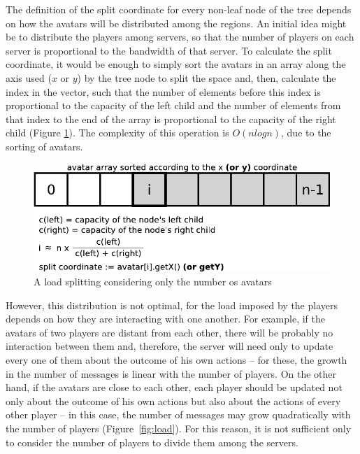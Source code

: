 \documentclass[acmtocl]{acmtrans2m}
\begin{document}
The definition of the split coordinate for every non-leaf node of the tree depends on how the avatars will be distributed among the regions. An initial idea might be to distribute the players among servers, so that the number of players on each server is proportional to the bandwidth of that server. To calculate the split coordinate, it would be enough to simply sort the avatars in an array along the axis used ($x$ or $y$) by the tree node to split the space and, then, calculate the index in the vector, such that the number of elements before this index is proportional to the capacity of the left child and the number of elements from that index to the end of the array is proportional to the capacity of the right child (Figure \ref{fig:vector}). The complexity of this operation is $O(nlogn)$, due to the sorting of avatars.

\begin{figure}
  \centering
  \includegraphics[width=\linewidth]{images/vector}
  \caption{A load splitting considering only the number os avatars}
  \label{fig:vector}
\end{figure}

However, this distribution is not optimal, for the load imposed by the players depends on how they are interacting with one another. For example, if the avatars of two players are distant from each other, there will be probably no interaction between them and, therefore, the server will need only to update every one of them about the outcome of his own actions -- for these, the growth in the number of messages is linear with the number of players. On the other hand, if the avatars are close to each other, each player should be updated not only about the outcome of his own actions but also about the actions of every other player -- in this case, the number of messages may grow quadratically with the number of players \mbox{(Figure \ref{fig:load})}. For this reason, it is not sufficient only to consider the number of players to divide them among the servers.
\end{document}

